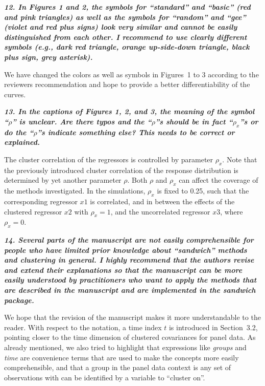 \documentclass[10pt,a4paper]{article}
\begin{document}
\textbf{\textit{12. In Figures 1 and 2, the symbols for ``standard'' and ``basic'' (red and pink triangles)
as well as the symbols for ``random'' and ``gee'' (violet and red plus signs) look very
similar and cannot be easily distinguished from each other. I recommend to use clearly
different symbols (e.g., dark red triangle, orange up-side-down triangle, black plus sign,
grey asterisk).}}

\medskip

We have changed the colors as well as symbols in Figures~1 to 3 according to the reviewers recommendation and hope to provide a better differentiability of the curves.

\medskip

\textbf{\textit{13. In the captions of Figures 1, 2, and 3, the meaning of the symbol ``$\rho$'' is unclear. Are
there typos and the ``$\rho$''s should be in fact ``$\rho_x$''s or do the ``$\rho$''s indicate something else?
This needs to be correct or explained.}}

\medskip

The cluster correlation of the regressors is controlled by parameter $\rho_x$. Note that the previously introduced cluster correlation of the response distribution is determined by yet another parameter $\rho$. Both $\rho$ and $\rho_x$ can affect the coverage of the methods investigated. In the simulations, $\rho_x$ is fixed to 0.25, such that the corresponding regressor $x1$ is correlated, and in between the effects of the clustered regressor $x2$ with $\rho_x = 1$, and the uncorrelated regressor $x3$, where $\rho_x = 0$.

\medskip

\textbf{\textit{14. Several parts of the manuscript are not easily comprehensible for people who have limited
prior knowledge about ``sandwich'' methods and clustering in general. I highly recommend
that the authors revise and extend their explanations so that the manuscript can be more
easily understood by practitioners who want to apply the methods that are described in
the manuscript and are implemented in the sandwich package.}}

\medskip

We hope that the revision of the manuscript makes it more understandable to the reader.
With respect to the notation, a time index $t$ is introduced in Section~3.2, pointing closer to the time dimension of clustered covariances for panel data.  
As already mentioned, we also tried to highlight that expressions like \emph{groups} and \emph{time} are convenience terms that are used to make the concepts more easily comprehensible, and that a group in the panel data context is any set of observations with can be identified by a variable to ``cluster on''. 
\end{document}
